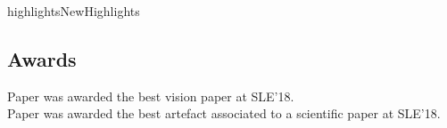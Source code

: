\documentclass{ra2018}
\begin{document}
\begin{module}{highlights}{NewHighlights}{}
\begin{description}
\end{description}



\subsection{Awards}



Paper  was awarded the best vision paper at SLE'18. \\
Paper  was awarded the best artefact associated to a scientific paper at SLE'18. 

\end{module}


\end{document}
